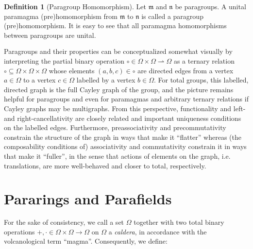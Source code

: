 \documentclass{article}
\theoremstyle{definition}
\newtheorem{definition}{Definition}[section]
\newcommand{\pto}{\rightharpoonup}
\begin{document}

\begin{definition}[Paragroup Homomorphism]
Let \(\mathfrak{m}\) and \(\mathfrak{n}\) be paragroups. A unital paramagma (pre)homomorphism from \(\mathfrak{m}\) to \(\mathfrak{n}\) is called a paragroup (pre)homomorphism. It is easy to see that all paramagma homomorphisms between paragroups are unital.
\end{definition}

Paragroups and their properties can be conceptualized somewhat visually by interpreting the partial binary operation \(\circ\in\Omega\times\Omega\pto\Omega\) as a ternary relation \(\circ\subseteq\Omega\times\Omega\times\Omega\) whose elements \((a,b,c)\in\circ\) are directed edges from a vertex \(a\in\Omega\) to a vertex \(c\in\Omega\) labelled by a vertex \(b\in\Omega\). For total groups, this labelled, directed graph is the full Cayley graph of the group, and the picture remains helpful for paragroups and even for paramagmas and arbitrary ternary relations if Cayley graphs may be multigraphs. From this perspective, functionality and left- and right-cancellativity are closely related and important uniqueness conditions on the labelled edges. Furthermore, preassociativity and precommutativity constrain the structure of the graph in ways that make it ``flatter'' whereas (the composability conditions of) associativity and commutativity constrain it in ways that make it ``fuller'', in the sense that actions of elements on the graph, i.e. translations, are more well-behaved and closer to total, respectively.

\section{Pararings and Parafields}

For the sake of consistency, we call a set \(\Omega\) together with two total binary operations \(+,\cdot\in\Omega\times\Omega\to\Omega\) on \(\Omega\) a \textit{caldera}, in accordance with the volcanological term ``magma''. Consequently, we define:
\end{document}
